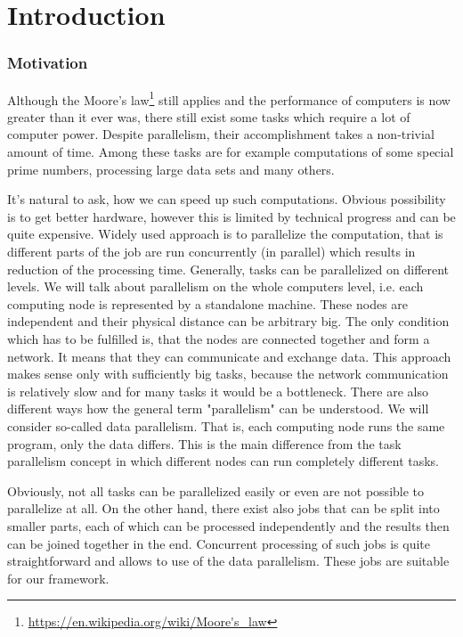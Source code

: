 \chapter*{Introduction}
\subsection*{Motivation}

Although the Moore's law\footnote{\url{https://en.wikipedia.org/wiki/Moore's\_law}} still applies and the performance of computers is now greater than it ever was, there still exist some tasks which require a lot of computer power. Despite parallelism, their accomplishment takes a non-trivial amount of time. Among these tasks are for example computations of some special prime numbers, processing large data sets and many others.

It's natural to ask, how we can speed up such computations. Obvious possibility is to get better hardware, however this is limited by technical progress and can be quite expensive. Widely used approach is to parallelize the computation, that is different parts of the job are run concurrently (in parallel) which results in reduction of the processing time. Generally, tasks can be parallelized on different levels. We will talk about parallelism on the whole computers level, i.e. each computing node is represented by a standalone machine. These nodes are independent and their physical distance can be arbitrary big. The only condition which has to be fulfilled is, that the nodes are connected together and form a network. It means that they can communicate and exchange data. This approach makes sense only with sufficiently big tasks, because the network communication is relatively slow and for many tasks it would be a bottleneck. There are also different ways how the general term "parallelism" can be understood. We will consider so-called data parallelism. That is, each computing node runs the same program, only the data differs. This is the main difference from the task parallelism concept in which different nodes can run completely different tasks.

Obviously, not all tasks can be parallelized easily or even are not possible to parallelize at all. On the other hand, there exist also jobs that can be split into smaller parts, each of which can be processed independently and the results then can be joined together in the end. Concurrent processing of such jobs is quite straightforward and allows to use of the data parallelism. These jobs are suitable for our framework.

